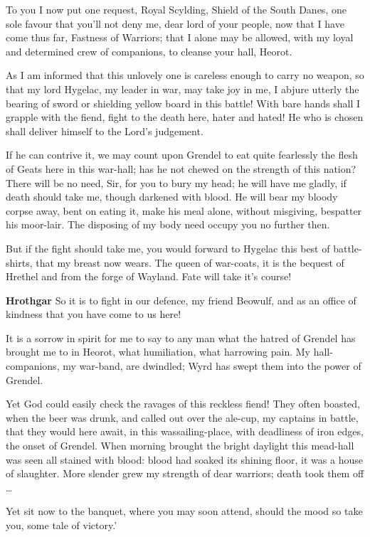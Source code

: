 \documentclass[a4paper]{article}
\begin{document}
{To you I now
put one request, Royal Scylding,
Shield of the South Danes, one sole favour
that you’ll not deny me, dear lord of your people,
now that I have come thus far, Fastness of Warriors;
that I alone may be allowed, with my loyal and determined
crew of companions, to cleanse your hall, Heorot.

As I am informed that this unlovely one
is careless enough to carry no weapon,
so that my lord Hygelac, my leader in war,
may take joy in me, I abjure utterly
the bearing of sword or shielding yellow
board in this battle! With bare hands shall I
grapple with the fiend, fight to the death here,
hater and hated! He who is chosen
shall deliver himself to the Lord’s judgement.

If he can contrive it, we may count upon Grendel
to eat quite fearlessly the flesh of Geats
here in this war-hall; has he not chewed
on the strength of this nation? There will be no need, Sir,
for you to bury my head; he will have me gladly,
if death should take me, though darkened with blood.
He will bear my bloody corpse away, bent on eating it,
make his meal alone, without misgiving,
bespatter his moor-lair. The disposing of my body
need occupy you no further then.

But if the fight should take me, you would forward to Hygelac
this best of battle-shirts, that my breast now wears.
The queen of war-coats, it is the bequest of Hrethel
and from the forge of Wayland. 
Fate will take it's course!

\textbf{Hrothgar} So it is to fight in our defence, my friend Beowulf,
and as an office of kindness that you have come to us here!

It is a sorrow in spirit for me to say to any man
what the hatred of Grendel has brought me to in Heorot, 
what humiliation, what harrowing pain. 
My hall-companions, my war-band, are dwindled; 
Wyrd has swept them into the power of Grendel.

Yet God could easily check the ravages of this reckless fiend!
They often boasted, when the beer was drunk,
and called out over the ale-cup, my captains in battle,
that they would here await, in this wassailing-place,
with deadliness of iron edges, the onset of Grendel.
When morning brought the bright daylight
this mead-hall was seen all stained with blood:
blood had soaked its shining floor,
it was a house of slaughter. More slender grew my
strength of dear warriors; death took them off …

Yet sit now to the banquet, where you may soon attend,
should the mood so take you, some tale of victory.’

}
\end{document}
